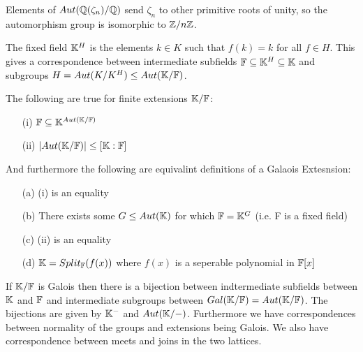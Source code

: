 \documentclass[11pt]{article}
\begin{document}
\begin{example}
  Elements of $Aut(\mathbb{Q}(\zeta_n)/\mathbb{Q})$ send $\zeta_n$ to other primitive roots of unity, so the automorphism group is isomorphic to $\mathbb{Z}/n\mathbb{Z}$.
\end{example}

\begin{definition}
  The fixed field $\mathbb{K}^H$ is the elements $k \in K$ such that $f(k) = k$ for all $f \in H$. This gives a correspondence between intermediate subfields $\mathbb{F} \subseteq \mathbb{K}^H \subseteq \mathbb{K}$ and subgroups $H = Aut(K/K^H) \le Aut(\mathbb{K}/\mathbb{F})$.
\end{definition}
\begin{theorem}
  The following are true for finite extensions $\mathbb{K}/\mathbb{F}$:
  \begin{itemize}
  \item[(i)] $\mathbb{F} \subseteq \mathbb{K}^{Aut(\mathbb{K}/\mathbb{F})}$
  \item[(ii)] $|Aut(\mathbb{K}/\mathbb{F})| \le [\mathbb{K} : \mathbb{F}]$
  \end{itemize}
  And furthermore the following are equivalint definitions of a Galaois Extesnsion:
  \begin{itemize}
  \item[(a)] (i) is an equality
  \item[(b)] There exists some $G \le Aut(\mathbb{K})$ for which $\mathbb{F} = \mathbb{K}^G$ (i.e. F is a fixed field)
  \item[(c)] (ii) is an equality
  \item[(d)] $\mathbb{K} = Split_{\mathbb{F}}(f(x))$ where $f(x)$ is a seperable polynomial in $\mathbb{F}[x]$
  \end{itemize}
\end{theorem}

\begin{theorem}
  If $\mathbb{K}/\mathbb{F}$ is Galois then there is a bijection between indtermediate subfields between $\mathbb{K}$ and $\mathbb{F}$ and intermediate subgroups between $Gal(\mathbb{K}/\mathbb{F}) = Aut(\mathbb{K}/\mathbb{F})$. The bijections are given by $\mathbb{K}^-$ and $Aut(\mathbb{K}/-)$. Furthermore we have correspondences between normality of the groups and extensions being Galois. We also have correspondence between meets and joins in the two lattices. 
\end{theorem}
\end{document}
